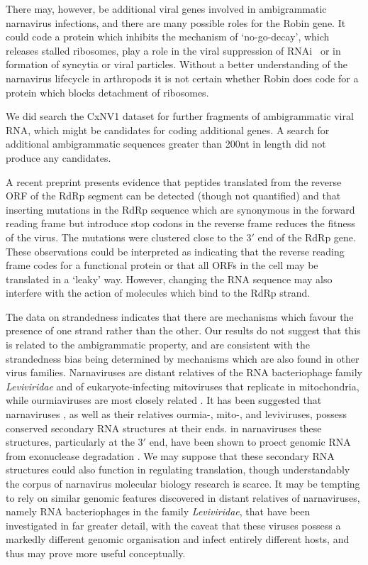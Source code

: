\documentclass[unnumsec,webpdf,contemporary,large]{oup-authoring-template}%
\theoremstyle{thmstyleone}%
\theoremstyle{thmstyletwo}%
\theoremstyle{thmstylethree}%
\begin{document}
There may, however, be additional viral genes involved in ambigrammatic narnavirus
infections, and there are many possible roles for the Robin gene. It could code a protein which inhibits
the mechanism of \lq no-go-decay', which releases stalled ribosomes, play a role in the
viral suppression of RNAi~\citep{mie_14} or in formation of syncytia or viral particles.
Without a better understanding of the narnavirus lifecycle in arthropods it is not certain whether
Robin does code for a protein which blocks detachment of ribosomes.

We did search the CxNV1 dataset for further fragments of ambigrammatic viral RNA, which might be
candidates for coding additional genes. A search for additional ambigrammatic sequences greater than 200nt
in length did not produce any candidates.

A recent preprint \citep{Ret+20}
presents evidence that peptides translated from the reverse ORF of the RdRp segment can be detected (though not quantified) and that inserting mutations in the RdRp sequence which are synonymous in the forward
reading frame but introduce stop codons in the reverse frame reduces the fitness of the virus. The mutations
were clustered close to the $3'$ end of the RdRp gene. These
observations could be interpreted as indicating that the reverse reading frame codes for a functional
protein or that all ORFs in the cell may be translated in a \lq leaky' way.
However, changing the RNA sequence may also interfere with the action of molecules which
bind to the RdRp strand.

The data on strandedness indicates that there are mechanisms which favour the
presence of one strand rather than the other. Our results do not suggest that this is
related to the ambigrammatic property, and are consistent with the strandedness bias
being determined by mechanisms which are also found in other virus families. Narnaviruses are
distant relatives of the RNA bacteriophage family \textit{Leviviridae} and of
eukaryote-infecting mitoviruses that replicate in mitochondria, while ourmiaviruses are most
closely related \citep{shi_16}. It has been suggested that narnaviruses \citep{rodriguez-cousino+98}, as
well as their relatives ourmia-, mito-, and leviviruses, possess conserved secondary RNA structures at their ends.
in narnaviruses these structures, particularly at the $3'$ end, have been shown to proect genomic RNA
from exonuclease degradation \citep{Est+05}. We may suppose that these secondary RNA structures could also
function in regulating translation, though understandably the corpus of narnavirus molecular biology research
is scarce. It may be tempting to rely on similar genomic features discovered in distant relatives of
narnaviruses, namely RNA bacteriophages in the family \textit{Leviviridae},
that have been investigated in far greater detail, with the caveat that these viruses possess a
markedly different genomic organisation and infect entirely different hosts, and thus may prove more
useful conceptually.
\end{document}
